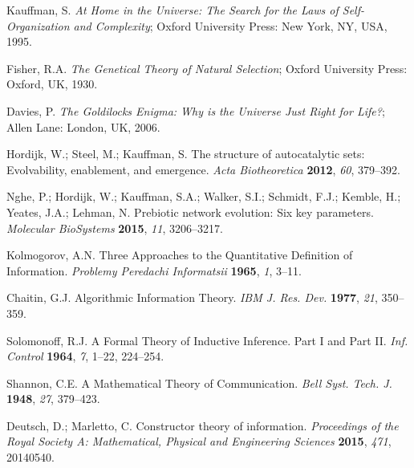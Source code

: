 \documentclass[preprint,12pt]{elsarticle}
\begin{document}
%

\begin{thebibliography}{999}

Kauffman, S. \textit{At Home in the Universe: The Search for the Laws of Self-Organization and Complexity}; Oxford University Press: New York, NY, USA, 1995.

Fisher, R.A. \textit{The Genetical Theory of Natural Selection}; Oxford University Press: Oxford, UK, 1930.

Davies, P. \textit{The Goldilocks Enigma: Why is the Universe Just Right for Life?}; Allen Lane: London, UK, 2006.

Hordijk, W.; Steel, M.; Kauffman, S. The structure of autocatalytic sets: Evolvability, enablement, and emergence. \textit{Acta Biotheoretica} \textbf{2012}, \textit{60}, 379–392.


Nghe, P.; Hordijk, W.; Kauffman, S.A.; Walker, S.I.; Schmidt, F.J.; Kemble, H.; Yeates, J.A.; Lehman, N. Prebiotic network evolution: Six key parameters. \textit{Molecular BioSystems} \textbf{2015}, \textit{11}, 3206–3217.

Kolmogorov, A.N. Three Approaches to the Quantitative Definition of Information. \textit{Problemy Peredachi Informatsii} \textbf{1965}, \textit{1}, 3–11.

Chaitin, G.J. Algorithmic Information Theory. \textit{IBM J. Res. Dev.} \textbf{1977}, \textit{21}, 350–359.

Solomonoff, R.J. A Formal Theory of Inductive Inference. Part I and Part II. \textit{Inf. Control} \textbf{1964}, \textit{7}, 1–22, 224–254.

Shannon, C.E. A Mathematical Theory of Communication. \textit{Bell Syst. Tech. J.} \textbf{1948}, \textit{27}, 379–423.

Deutsch, D.; Marletto, C. Constructor theory of information. \textit{Proceedings of the Royal Society A: Mathematical, Physical and Engineering Sciences} \textbf{2015}, \textit{471}, 20140540.


\end{thebibliography}
\end{document}
